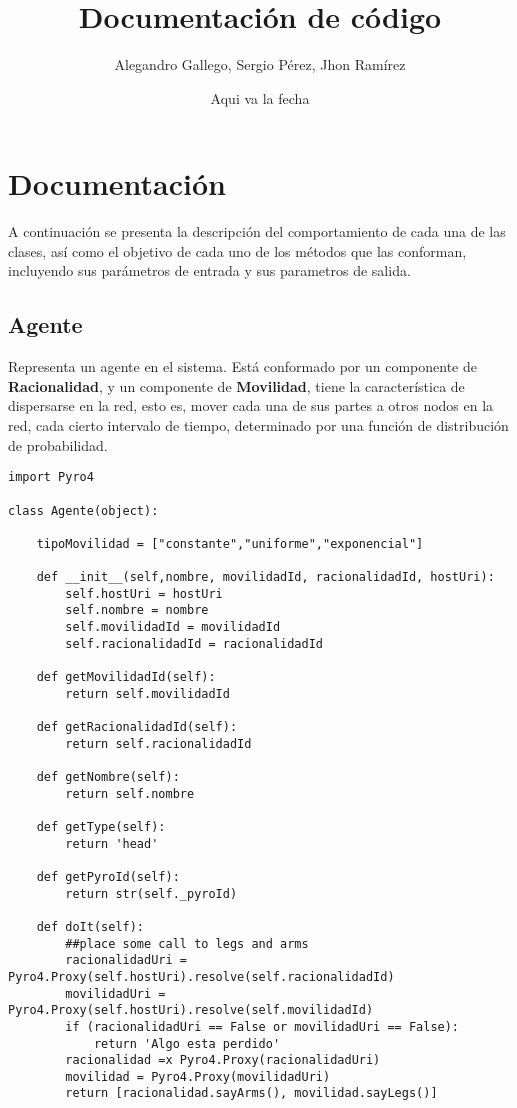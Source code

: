 \documentclass{article}
\begin{document}
\title{Documentación de código}
\author{Alegandro Gallego, Sergio Pérez, Jhon Ramírez}
\date{Aqui va la fecha}
\maketitle

\section{Documentación}
A continuación se presenta la descripción del comportamiento de cada una de las clases, así como el objetivo de cada uno de los métodos que las conforman, incluyendo sus parámetros de entrada y sus parametros de salida.

\subsection{Agente}
Representa un agente en el sistema. Está conformado por un componente de \textbf{Racionalidad}, y un componente de \textbf{Movilidad}, tiene la característica de dispersarse en la red, esto es, mover cada una de sus partes a otros nodos en la red, cada cierto intervalo de tiempo, determinado por una función de distribución de probabilidad.\\

\begin{lstlisting}
import Pyro4

class Agente(object):
    
    tipoMovilidad = ["constante","uniforme","exponencial"]    
    
    def __init__(self,nombre, movilidadId, racionalidadId, hostUri):
        self.hostUri = hostUri
        self.nombre = nombre
        self.movilidadId = movilidadId
        self.racionalidadId = racionalidadId

    def getMovilidadId(self):
        return self.movilidadId

    def getRacionalidadId(self):
        return self.racionalidadId
        
    def getNombre(self):
        return self.nombre
        
    def getType(self):
        return 'head'

    def getPyroId(self):
        return str(self._pyroId)

    def doIt(self):
        ##place some call to legs and arms
        racionalidadUri = Pyro4.Proxy(self.hostUri).resolve(self.racionalidadId)
        movilidadUri =  Pyro4.Proxy(self.hostUri).resolve(self.movilidadId)
        if (racionalidadUri == False or movilidadUri == False):
            return 'Algo esta perdido'
        racionalidad =x Pyro4.Proxy(racionalidadUri)
        movilidad = Pyro4.Proxy(movilidadUri)
        return [racionalidad.sayArms(), movilidad.sayLegs()]
\end{lstlisting}
\end{document}
